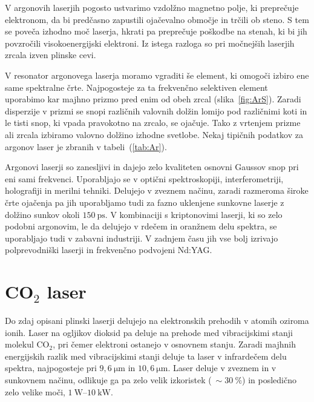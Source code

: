 \begin{remark}
V argonovih laserjih pogosto ustvarimo vzdolžno magnetno polje, ki preprečuje 
elektronom, da bi predčasno zapustili ojačevalno območje in trčili ob steno. S
tem se poveča izhodno moč laserja, hkrati pa preprečuje poškodbe na stenah, ki bi jih 
povzročili visokoenergijski elektroni. Iz istega razloga so pri močnejših
laserjih zrcala izven plinske cevi. 
\end{remark}

V resonator argonovega laserja moramo vgraditi še element, ki omogoči
izbiro ene same spektralne črte. Najpogosteje za ta frekvenčno selektiven element
uporabimo kar majhno prizmo pred enim od obeh zrcal (slika~\ref{fig:ArS}). Zaradi disperzije
v prizmi se snopi različnih valovnih dolžin lomijo pod različnimi koti in le tisti 
snop, ki vpada pravokotno na zrcalo, se ojačuje. Tako z vrtenjem prizme ali zrcala 
izbiramo valovno dolžino izhodne svetlobe. Nekaj tipičnih podatkov za argonov
laser je zbranih v tabeli~(\ref{tab:Ar}).

Argonovi laserji so zanesljivi in dajejo zelo kvaliteten osnovni Gaussov snop pri eni
sami frekvenci. Uporabljajo se v optični spektroskopiji,
interferometriji, holografiji in merilni tehniki. Delujejo v zveznem načinu,
zaradi razmeroma široke črte ojačenja pa jih uporabljamo tudi za fazno uklenjene
sunkovne laserje z dolžino sunkov okoli $150~\si{\pico\second}$. 
V kombinaciji s kriptonovimi laserji, ki so zelo podobni argonovim, le da delujejo
v rdečem in oranžnem delu spektra, se uporabljajo tudi v zabavni industriji.
V zadnjem času jih vse bolj izrivajo polprevodniški laserji in frekvenčno
podvojeni Nd:YAG. 

\section{CO$_2$ laser}
Do zdaj opisani plinski laserji delujejo na elektronskih prehodih v atomih oziroma ionih. 
Laser na ogljikov dioksid pa deluje na prehode med vibracijskimi stanji molekul 
CO$_2$, pri čemer elektroni ostanejo v osnovnem stanju.
Zaradi majhnih energijskih razlik med vibracijskimi stanji deluje
ta laser v infrardečem delu spektra, najpogosteje pri 
$9,6~\si{\micro\metre}$ in $10,6~\si{\micro\metre}$. Laser deluje v zveznem
in v sunkovnem načinu, odlikuje ga pa zelo velik izkoristek ($~\sim 30~\%$) in 
posledično zelo velike moči, $1~\si{\watt}$--$10~\si{\kilo\watt}$. 

